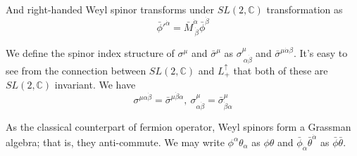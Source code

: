 \documentclass[12pt]{book}
\begin{document}
	And right-handed Weyl spinor transforms under $SL(2,\mathbb C)$ transformation as
	\begin{equation}
		\bar\phi'^{\dot\alpha}=\bar M^{\dot\alpha}_{\ \dot\beta}\bar\phi^{\dot\beta}
	\end{equation}
	
	We define the spinor index structure of $\sigma^\mu$ and $\bar\sigma^\mu$ as $\sigma^\mu_{\ \alpha\dot\beta}$ and $\bar\sigma^{\mu\dot\alpha\beta}$. It's easy to see from the connection between $SL(2,\mathbb C)$ and $L_+^\uparrow$ that both of these are $SL(2,\mathbb C)$ invariant. We have
	\begin{equation}
		\sigma^{\mu\alpha\dot\beta}=\bar\sigma^{\mu\dot\beta\alpha} ,\ \sigma^\mu_{\alpha\dot\beta}=\bar\sigma^\mu_{\dot\beta\alpha}
	\end{equation} 

	As the classical counterpart of fermion operator, Weyl spinors form a Grassman algebra; that is, they anti-commute. We may write $\phi^\alpha\theta_\alpha$ as $\phi\theta$ and $\bar\phi_{\dot\alpha}\bar\theta^{\dot\alpha}$ as $\bar\phi\bar\theta$.
	
\end{document}
